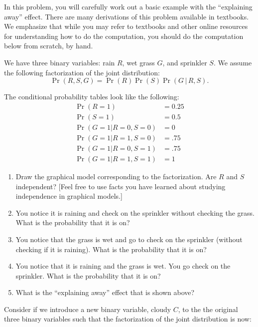\documentclass[submit]{harvardml}
\begin{document}
\begin{problem}

  In this problem, you will carefully work out a basic example with
  the ``explaining away'' effect. There are many derivations of this
  problem available in textbooks. We emphasize that while you may
  refer to textbooks and other online resources for understanding how
  to do the computation, you should do the computation below from
  scratch, by hand.

  We have three binary variables: rain $R$, wet grass $G$, and
  sprinkler $S$.
We  assume the following factorization of the joint distribution:
$$
\Pr(R,S,G) = \Pr(R)\Pr(S)\Pr(G\, |\, R, S).
  $$
  
  The conditional probability tables look like the
  following:
  \begin{eqnarray*}
    \Pr(R = 1) &= 0.25 \\
    \Pr(S = 1) &= 0.5 \\
    \Pr(G = 1 | R = 0 , S = 0 ) &= 0 \\
    \Pr(G = 1 | R = 1 , S = 0 ) &= .75 \\
    \Pr(G = 1 | R = 0 , S = 1 ) &= .75 \\
    \Pr(G = 1 | R = 1 , S = 1 ) &= 1
  \end{eqnarray*}
  
 
  \begin{enumerate}
    \item Draw the graphical model corresponding to the
      factorization. Are $R$ and $S$ independent?  [Feel free to use
      facts you have learned about studying independence in graphical models.]
    \item You notice it is raining and check on the sprinkler without
      checking the grass.  What is the probability that it is on?
    \item You notice that the grass is wet and go to check on the
      sprinkler (without checking if it is raining).  What is the
      probability that it is on?
    \item You notice that it is raining and the grass is wet.  You go
      check on the sprinkler.  What is the probability that it is on?
    \item What is the ``explaining away'' effect that is shown above?
    \end{enumerate}
    
Consider if we introduce a new binary variable, cloudy $C$, to the the original three binary variables such that the factorization of the joint distribution is now: 


\end{problem}
\end{document}
